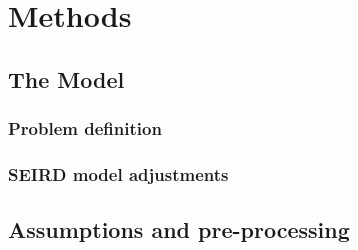 
\chapter{Methods} %

\label{chap:methods} %


\section{The Model}

\subsection{Problem definition}

\subsection{SEIRD model adjustments}
\label{sec:SEIRDredef}


\section{Assumptions and pre-processing}



